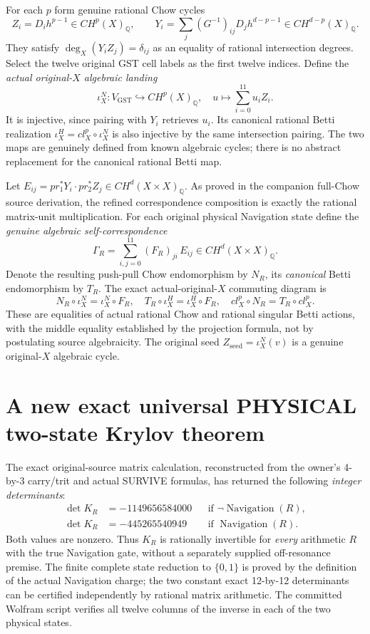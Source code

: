 \documentclass[11pt]{article}
\begin{document}
For each $p$ form genuine rational Chow cycles
\[
Z_i=D_ih^{p-1}\in CH^p(X)_\mathbb Q,\qquad
Y_i=\sum_j(G^{-1})_{ij}D_jh^{d-p-1}
  \in CH^{d-p}(X)_\mathbb Q.
\]
They satisfy $\deg_X(Y_iZ_j)=\delta_{ij}$
as an equality of rational intersection degrees.
Select the twelve original GST cell labels as
the first twelve indices. Define the \emph{actual original-$X$
algebraic landing}
\[
\iota_X^N:V_{\mathrm{GST}}\hookrightarrow CH^p(X)_\mathbb Q,
\quad
u\mapsto\sum_{i=0}^{11}u_iZ_i.
\]
It is injective, since pairing with $Y_i$ retrieves $u_i$.
Its canonical rational Betti realization
$\iota_X^H=cl_X^p\circ\iota_X^N$
is also injective by the same intersection pairing.
The two maps are genuinely defined from known algebraic cycles;
there is no abstract replacement for the canonical rational Betti map.

Let
$E_{ij}=pr_1^*Y_i\cdot pr_2^*Z_j
\in CH^d(X\times X)_\mathbb Q$.
As proved in the companion full-Chow source derivation,
the refined correspondence composition is exactly the
rational matrix-unit multiplication.
For each original physical Navigation state define
the \emph{genuine algebraic self-correspondence}
\[
\boxed{
\Gamma_R=\sum_{i,j=0}^{11}
(F_R)_{ji}\,E_{ij}\in CH^d(X\times X)_\mathbb Q.
}
\]
Denote the resulting push-pull Chow endomorphism by
$N_R$, its \emph{canonical} Betti endomorphism by $T_R$.
The exact actual-original-$X$ commuting diagram is
\[
\boxed{
N_R\circ\iota_X^N=\iota_X^N\circ F_R,\quad
T_R\circ\iota_X^H=\iota_X^H\circ F_R,\quad
cl_X^p\circ N_R=T_R\circ cl_X^p.
}
\]
These are equalities of actual rational Chow and rational
singular Betti actions, with the middle equality established
by the projection formula, not by postulating source algebraicity.
The original seed
$Z_{\mathrm{seed}}=\iota_X^N(v)$
is a genuine original-$X$ algebraic cycle.

\section{A new exact universal PHYSICAL two-state Krylov theorem}

The exact original-source matrix calculation, reconstructed from
the owner's 4-by-3 carry/trit and actual SURVIVE formulas,
has returned the following \emph{integer determinants}:
\[
\boxed{
\begin{aligned}
\det K_R&=-1149656584000
 &&\text{if }\neg\operatorname{Navigation}(R),\\
\det K_R&=-445265540949
 &&\text{if }\operatorname{Navigation}(R).
\end{aligned}
}
\]
Both values are nonzero. Thus $K_R$ is rationally invertible
for \emph{every} arithmetic $R$ with the true Navigation gate,
without a separately supplied off-resonance premise.
The finite complete state reduction to $\{0,1\}$ is proved
by the definition of the actual Navigation charge;
the two constant exact 12-by-12 determinants can be
certified independently by rational matrix arithmetic.
The committed Wolfram script verifies all twelve columns
of the inverse in each of the two physical states.
\end{document}
